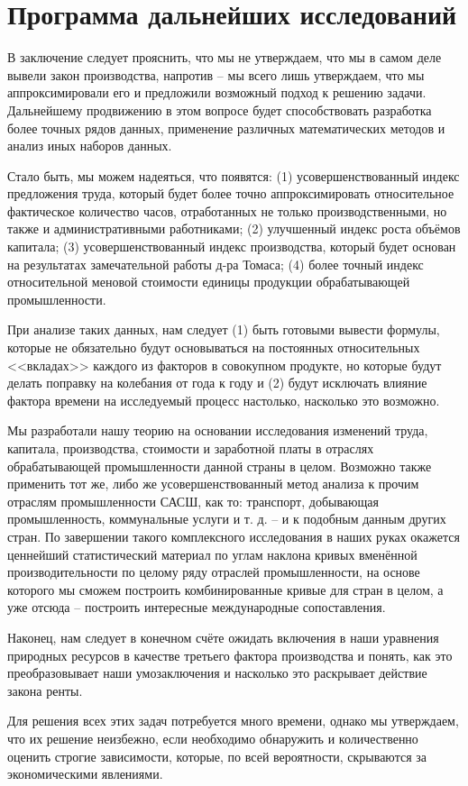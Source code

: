 \documentclass[leqno]{article}  %
\begin{document}
\section{Программа дальнейших исследований}
В заключение следует прояснить, что мы не утверждаем, что мы в самом деле вывели закон производства,
напротив -- мы всего лишь утверждаем, что мы аппроксимировали его и предложили возможный подход к решению задачи. Дальнейшему продвижению в этом вопросе будет способствовать разработка более точных рядов данных, применение различных математических методов и анализ иных наборов данных.
\par
Стало быть, мы можем надеяться, что появятся: (1) усовершенствованный индекс предложения труда, который будет более точно аппроксимировать относительное фактическое количество часов, отработанных не только производственными, но также и административными работниками; (2) улучшенный индекс роста объёмов капитала; (3) усовершенствованный индекс производства, который будет основан на результатах замечательной работы д-ра Томаса; (4) более точный индекс относительной меновой стоимости единицы продукции обрабатывающей промышленности.
\par
При анализе таких данных, нам следует (1) быть готовыми вывести формулы, которые не обязательно будут основываться на постоянных относительных <<вкладах>> каждого из факторов в совокупном продукте, но которые будут делать поправку на колебания от года к году и (2) будут исключать влияние фактора времени на исследуемый процесс настолько, насколько это возможно.
\par
Мы разработали нашу теорию на основании исследования изменений труда, капитала, производства, стоимости и заработной платы в отраслях обрабатывающей промышленности данной страны в целом. Возможно также применить тот же, либо же усовершенствованный метод анализа к прочим отраслям промышленности САСШ, как то: транспорт, добывающая промышленность, коммунальные услуги и т. д. -- и к подобным данным других стран. По завершении такого комплексного исследования в наших руках окажется ценнейший статистический материал по углам наклона кривых вменённой производительности по целому ряду отраслей промышленности, на основе которого мы сможем построить комбинированные кривые для стран в целом, а уже отсюда -- построить интересные международные сопоставления.
\par
Наконец, нам следует в конечном счёте ожидать включения в наши уравнения природных ресурсов в качестве третьего фактора производства и понять, как это преобразовывает наши умозаключения и насколько это раскрывает действие закона ренты.
\par
Для решения всех этих задач потребуется много времени, однако мы утверждаем, что их решение неизбежно, если необходимо обнаружить и количественно оценить строгие зависимости, которые, по всей вероятности, скрываются за экономическими явлениями.
\end{document}
